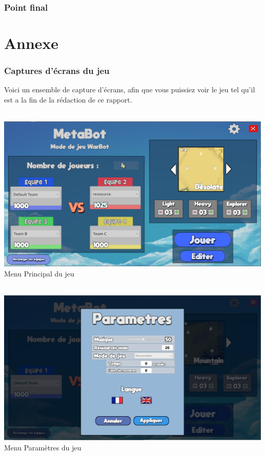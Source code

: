 \documentclass{report}
\begin{document}
\section{Point final}

\part{Annexe}
\section{Captures d'écrans du jeu}
Voici un ensemble de capture d’écrans, afin que vous puissiez voir le jeu tel qu’il est a la fin de la rédaction de ce rapport.

\paragraph{}
\begin{adjustwidth}{-3em}{}
\includegraphics[scale=0.5]{DATA/menuprincipal.png}
 {Menu Principal du jeu}
\end{adjustwidth}
\paragraph{}


\paragraph{}
\begin{adjustwidth}{-3em}{}
\includegraphics[scale=0.5]{DATA/menuparametre.png}
 {Menu Paramètres du jeu}
\end{adjustwidth}
\end{document}
